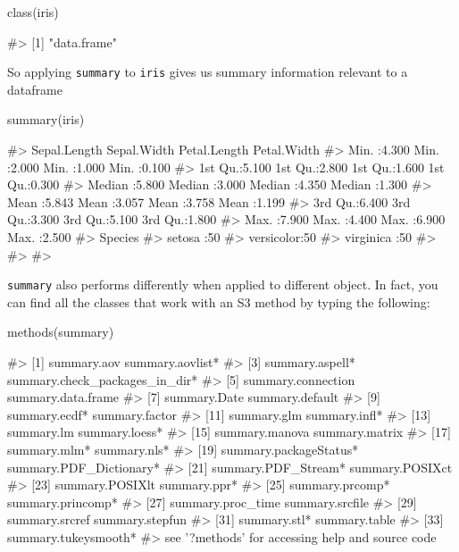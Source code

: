 \begin{Schunk}
\begin{Sinput}
class(iris)
\end{Sinput}
\begin{Soutput}
#> [1] "data.frame"
\end{Soutput}
\end{Schunk}

So applying \texttt{summary} to \texttt{iris} gives us summary
information relevant to a dataframe

\begin{Schunk}
\begin{Sinput}
summary(iris)
\end{Sinput}
\begin{Soutput}
#>   Sepal.Length    Sepal.Width     Petal.Length    Petal.Width   
#>  Min.   :4.300   Min.   :2.000   Min.   :1.000   Min.   :0.100  
#>  1st Qu.:5.100   1st Qu.:2.800   1st Qu.:1.600   1st Qu.:0.300  
#>  Median :5.800   Median :3.000   Median :4.350   Median :1.300  
#>  Mean   :5.843   Mean   :3.057   Mean   :3.758   Mean   :1.199  
#>  3rd Qu.:6.400   3rd Qu.:3.300   3rd Qu.:5.100   3rd Qu.:1.800  
#>  Max.   :7.900   Max.   :4.400   Max.   :6.900   Max.   :2.500  
#>        Species  
#>  setosa    :50  
#>  versicolor:50  
#>  virginica :50  
#>                 
#>                 
#> 
\end{Soutput}
\end{Schunk}

\texttt{summary} also performs differently when applied to different
object. In fact, you can find all the classes that work with an S3
method by typing the following:

\begin{Schunk}
\begin{Sinput}
methods(summary)
\end{Sinput}
\begin{Soutput}
#>  [1] summary.aov                    summary.aovlist*              
#>  [3] summary.aspell*                summary.check_packages_in_dir*
#>  [5] summary.connection             summary.data.frame            
#>  [7] summary.Date                   summary.default               
#>  [9] summary.ecdf*                  summary.factor                
#> [11] summary.glm                    summary.infl*                 
#> [13] summary.lm                     summary.loess*                
#> [15] summary.manova                 summary.matrix                
#> [17] summary.mlm*                   summary.nls*                  
#> [19] summary.packageStatus*         summary.PDF_Dictionary*       
#> [21] summary.PDF_Stream*            summary.POSIXct               
#> [23] summary.POSIXlt                summary.ppr*                  
#> [25] summary.prcomp*                summary.princomp*             
#> [27] summary.proc_time              summary.srcfile               
#> [29] summary.srcref                 summary.stepfun               
#> [31] summary.stl*                   summary.table                 
#> [33] summary.tukeysmooth*          
#> see '?methods' for accessing help and source code
\end{Soutput}
\end{Schunk}

